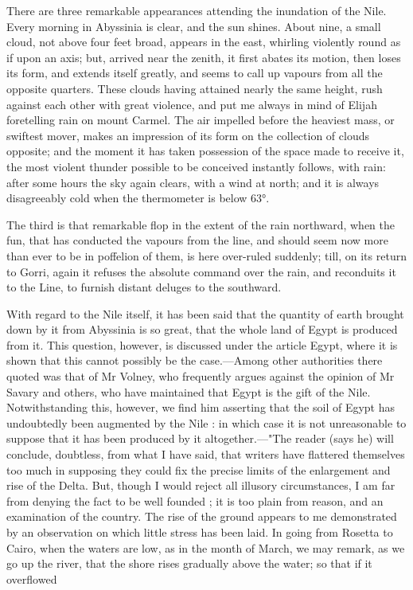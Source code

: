\documentclass{article}
\begin{document}
There are three remarkable appearances attending the inundation of the Nile. Every morning in Abyssinia is clear, and the sun shines. About nine, a small cloud, not above four feet broad, appears in the east, whirling violently round as if upon an axis; but, arrived near the zenith, it first abates its motion, then loses its form, and extends itself greatly, and seems to call up vapours from all the opposite quarters. These clouds having attained nearly the same height, rush against each other with great violence, and put me always in mind of Elijah foretelling rain on mount Carmel. The air impelled before the heaviest mass, or swiftest mover, makes an impression of its form on the collection of clouds opposite; and the moment it has taken possession of the space made to receive it, the most violent thunder possible to be conceived instantly follows, with rain: after some hours the sky again clears, with a wind at north; and it is always disagreeably cold when the thermometer is below 63°.

The third is that remarkable flop in the extent of the rain northward, when the fun, that has conducted the vapours from the line, and should seem now more than ever to be in poffelion of them, is here over-ruled suddenly; till, on its return to Gorri, again it refuses the absolute command over the rain, and reconduits it to the Line, to furnish distant deluges to the southward.

With regard to the Nile itself, it has been said that the quantity of earth brought down by it from Abyssinia is so great, that the whole land of Egypt is produced from it. This question, however, is discussed under the article Egypt, where it is shown that this cannot possibly be the case.—Among other authorities there quoted was that of Mr Volney, who frequently argues against the opinion of Mr Savary and others, who have maintained that Egypt is the gift of the Nile. Notwithstanding this, however, we find him asserting that the soil of Egypt has undoubtedly been augmented by the Nile : in which case it is not unreasonable to suppose that it has been produced by it altogether.—"The reader (says he) will conclude, doubtless, from what I have said, that writers have flattered themselves too much in supposing they could fix the precise limits of the enlargement and rise of the Delta. But, though I would reject all illusory circumstances, I am far from denying the fact to be well founded ; it is too plain from reason, and an examination of the country. The rise of the ground appears to me demonstrated by an observation on which little stress has been laid. In going from Rosetta to Cairo, when the waters are low, as in the month of March, we may remark, as we go up the river, that the shore rises gradually above the water; so that if it overflowed
\end{document}

